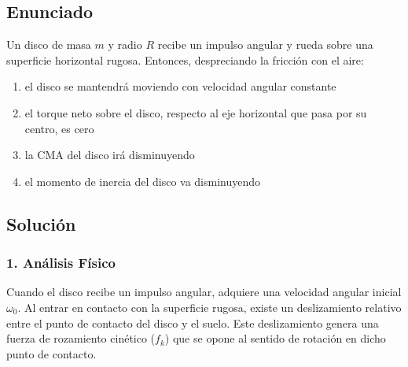 \documentclass[12pt, a4paper]{article}
\begin{document}
\newpage

\subsection*{Enunciado}
Un disco de masa $m$ y radio $R$ recibe un impulso angular y rueda sobre una superficie horizontal rugosa. Entonces, despreciando la fricción con el aire:
\begin{enumerate}[label=\alph*.]
    \item el disco se mantendrá moviendo con velocidad angular constante
    \item el torque neto sobre el disco, respecto al eje horizontal que pasa por su centro, es cero
    \item la CMA del disco irá disminuyendo
    \item el momento de inercia del disco va disminuyendo
\end{enumerate}

\subsection*{Solución}

\subsubsection*{1. Análisis Físico}
Cuando el disco recibe un impulso angular, adquiere una velocidad angular inicial $\omega_0$. Al entrar en contacto con la superficie rugosa, existe un deslizamiento relativo entre el punto de contacto del disco y el suelo. Este deslizamiento genera una fuerza de rozamiento cinético ($f_k$) que se opone al sentido de rotación en dicho punto de contacto.
\end{document}
